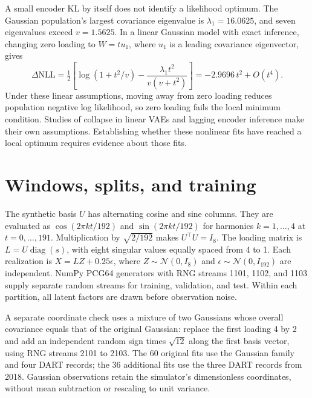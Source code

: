 \documentclass{article}
\begin{document}
A small encoder KL by itself does not identify a likelihood optimum. The Gaussian population's largest covariance eigenvalue is $\lambda_1=16.0625$, and seven eigenvalues exceed $v=1.5625$. In a linear Gaussian model with exact inference, changing zero loading to $W=t u_1$, where $u_1$ is a leading covariance eigenvector, gives
\begin{equation}
\Delta\mathrm{NLL}=\tfrac12\left[\log(1+t^2/v)-\frac{\lambda_1t^2}{v(v+t^2)}\right]
=-2.9696\,t^2+O(t^4).
\end{equation}
Under these linear assumptions, moving away from zero loading reduces population negative log likelihood, so zero loading fails the local minimum condition. Studies of collapse in linear VAEs \citep{Lucas2019LinearVAE} and lagging encoder inference \citep{He2019LaggingInference} make their own assumptions. Establishing whether these nonlinear fits have reached a local optimum requires evidence about those fits.

\section{Windows, splits, and training}
\label{sec:data}
The synthetic basis $U$ has alternating cosine and sine columns. They are evaluated as $\cos(2\pi kt/192)$ and $\sin(2\pi kt/192)$ for harmonics $k=1,\ldots,4$ at $t=0,\ldots,191$. Multiplication by $\sqrt{2/192}$ makes $U^\top U=I_8$. The loading matrix is $L=U\operatorname{diag}(s)$, with eight singular values equally spaced from 4 to 1. Each realization is $X=LZ+0.25\epsilon$, where $Z\sim\mathcal{N}(0,I_8)$ and $\epsilon\sim\mathcal{N}(0,I_{192})$ are independent. NumPy PCG64 generators with RNG streams 1101, 1102, and 1103 supply separate random streams for training, validation, and test. Within each partition, all latent factors are drawn before observation noise.

A separate coordinate check uses a mixture of two Gaussians whose overall covariance equals that of the original Gaussian: replace the first loading 4 by 2 and add an independent random sign times $\sqrt{12}$ along the first basis vector, using RNG streams 2101 to 2103. The 60 original fits use the Gaussian family and four DART records; the 36 additional fits use the three DART records from 2018. Gaussian observations retain the simulator's dimensionless coordinates, without mean subtraction or rescaling to unit variance.
\end{document}
